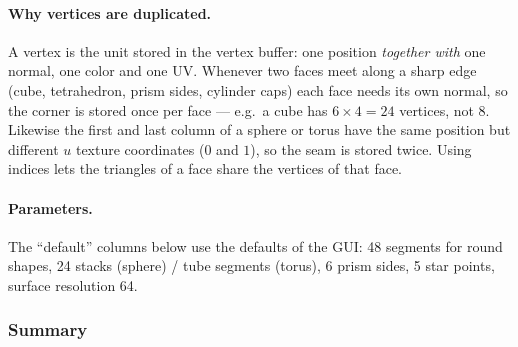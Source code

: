 \documentclass[a4paper, 11pt]{article}
\begin{document}
\paragraph{Why vertices are duplicated.}
A vertex is the unit stored in the vertex buffer: one position \emph{together with} one normal, one color and one UV.
Whenever two faces meet along a sharp edge (cube, tetrahedron, prism sides, cylinder caps) each face needs its own
normal, so the corner is stored once per face --- e.g.\ a cube has $6\times 4=24$ vertices, not 8. Likewise the first and
last column of a sphere or torus have the same position but different $u$ texture coordinates ($0$ and $1$), so the seam
is stored twice. Using indices lets the triangles of a face share the vertices of that face.

\paragraph{Parameters.} The ``default'' columns below use the defaults of the GUI: 48 segments for round shapes,
24 stacks (sphere) / tube segments (torus), 6 prism sides, 5 star points, surface resolution 64.

\subsubsection{Summary}
\end{document}
